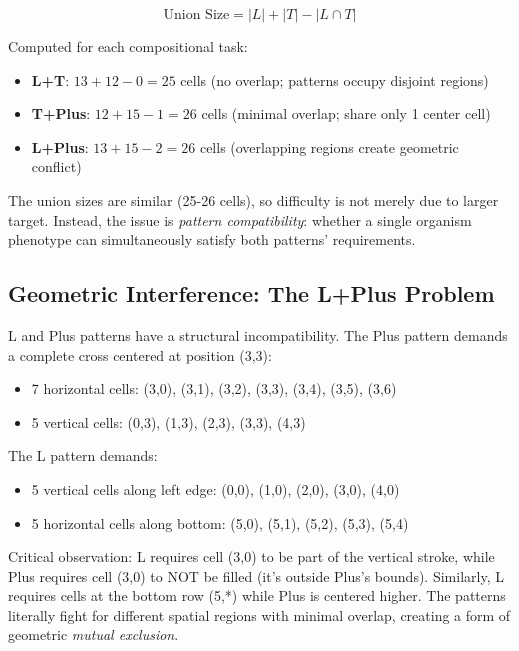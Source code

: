\documentclass[12pt]{article}
\begin{document}
\begin{equation}
\text{Union Size} = |L| + |T| - |L \cap T|
\end{equation}

\noindent Computed for each compositional task:
\begin{itemize}
\item \textbf{L+T}: $13 + 12 - 0 = 25$ cells (no overlap; patterns occupy disjoint regions)
\item \textbf{T+Plus}: $12 + 15 - 1 = 26$ cells (minimal overlap; share only 1 center cell)
\item \textbf{L+Plus}: $13 + 15 - 2 = 26$ cells (overlapping regions create geometric conflict)
\end{itemize}

The union sizes are similar (25-26 cells), so difficulty is not merely due to larger target. Instead, the issue is \textit{pattern compatibility}: whether a single organism phenotype can simultaneously satisfy both patterns' requirements.

\subsection*{Geometric Interference: The L+Plus Problem}

L and Plus patterns have a structural incompatibility. The Plus pattern demands a complete cross centered at position (3,3):
\begin{itemize}
\item 7 horizontal cells: (3,0), (3,1), (3,2), (3,3), (3,4), (3,5), (3,6)
\item 5 vertical cells: (0,3), (1,3), (2,3), (3,3), (4,3)
\end{itemize}

The L pattern demands:
\begin{itemize}
\item 5 vertical cells along left edge: (0,0), (1,0), (2,0), (3,0), (4,0)
\item 5 horizontal cells along bottom: (5,0), (5,1), (5,2), (5,3), (5,4)
\end{itemize}

Critical observation: L requires cell (3,0) to be part of the vertical stroke, while Plus requires cell (3,0) to NOT be filled (it's outside Plus's bounds). Similarly, L requires cells at the bottom row (5,*) while Plus is centered higher. The patterns literally fight for different spatial regions with minimal overlap, creating a form of geometric \textit{mutual exclusion}.
\end{document}
